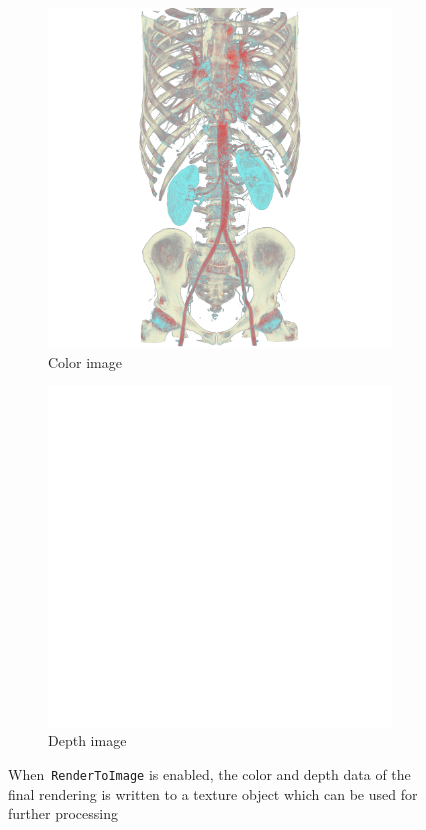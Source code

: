 \begin{figure}[ht]
\centering
  \begin{subfigure}[b]{.5\columnwidth}
    \centering
    \includegraphics[width=\columnwidth]{colorimage}
    \caption{Color image}
    \label{fig:rendertotexturecolor}
  \end{subfigure}%
  \begin{subfigure}[b]{.5\columnwidth}
    \centering
    \includegraphics[width=\columnwidth]{depthimage}
    \caption{Depth image}
    \label{fig:rendertotexturedepth}
  \end{subfigure}
  \caption{When~\texttt{RenderToImage} is enabled, the color and depth data of
    the final rendering is written to a texture object which can be used for
    further processing}
  \label{fig:rendertotexture}
\end{figure}

